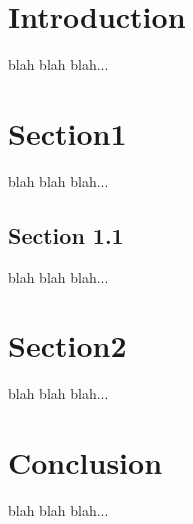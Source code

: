 \documentclass{report}
\begin{document}
\titlePage
\tableofcontents
\newpage
\section{Introduction}
blah blah blah...
\section{Section1}
blah blah blah...
\subsection{Section 1.1}
blah blah blah...
\newpage
\section{Section2}
blah blah blah...
\newpage
\section{Conclusion}
blah blah blah...
\end{document}
